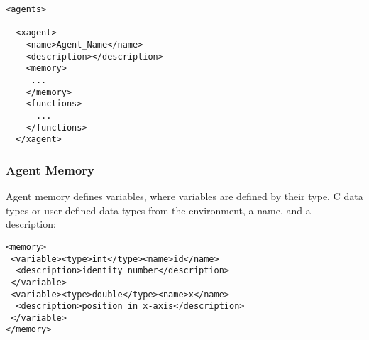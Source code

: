 \begin{mylisting}
\begin{verbatim}
<agents>

  <xagent>
    <name>Agent_Name</name>
    <description></description>
    <memory>
     ...
    </memory>
    <functions>
      ...
    </functions>
  </xagent>
\end{verbatim}
\end{mylisting}
%


\subsubsection{Agent Memory}

Agent memory defines variables, where variables are defined by their type, C
data types or user defined data types from the environment, a name, and a
description:

\begin{mylisting}
\begin{verbatim}
<memory>
 <variable><type>int</type><name>id</name>
  <description>identity number</description>
 </variable>
 <variable><type>double</type><name>x</name>
  <description>position in x-axis</description>
 </variable>
</memory>
\end{verbatim}
\end{mylisting}

